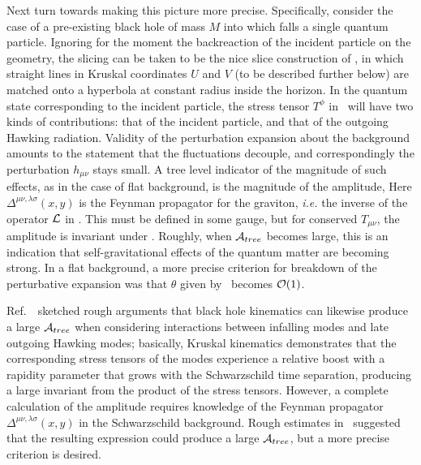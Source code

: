 
Next turn towards making this picture more precise.  Specifically, consider the case of a pre-existing black hole of mass $M$ into which falls a single quantum particle.  Ignoring for the moment the backreaction of the incident particle on the geometry, the slicing can be taken to be the nice slice construction of , in which straight lines in Kruskal coordinates $U$ and $V$ (to be described further below) are matched onto a hyperbola at constant radius inside the horizon.  In the quantum state corresponding to the incident particle, the stress tensor $T^\phi$ in \gravpert\ will have two kinds of contributions: that of the incident particle, and that of the outgoing Hawking radiation.  Validity of the perturbation expansion about the background amounts to the statement that the fluctuations decouple, and correspondingly the perturbation $h_{\mu\nu}$ stays small.  A tree level indicator of the magnitude of such effects, as in the case of flat background, is the magnitude of the amplitude,
%
\eqn{}
%
Here $\Delta^{\mu\nu,\lambda\sigma}(x,y)$ is the Feynman propagator for the graviton, {\it i.e.} the inverse of the operator ${\cal L}$ in \gravpert.  This must be defined in some gauge, but for conserved $T_{\mu\nu}$, the amplitude is invariant under \lindif.
Roughly, when ${\cal A}_{tree}$ becomes large, this is an indication that self-gravitational effects of the quantum matter are becoming strong. In a flat background, a more precise criterion for breakdown of the perturbative expansion was that $\theta$ given by \classang\  becomes ${\cal O}(1)$.  

Ref.~\SGnonloc\ sketched rough arguments that black hole kinematics can likewise produce a large ${\cal A}_{tree}$ when considering interactions between infalling modes and late outgoing Hawking modes; basically, Kruskal kinematics demonstrates that the corresponding stress tensors of the modes experience a relative boost with a rapidity parameter that grows with the Schwarzschild time separation, producing a large invariant from the product of the stress tensors.  However, a complete calculation of the amplitude requires knowledge of the Feynman propagator $\Delta^{\mu\nu,\lambda\sigma}(x,y)$ in the Schwarzschild background.  Rough estimates in \SGnonloc\ suggested that the resulting expression could produce a large ${\cal A}_{tree}$, but a more precise criterion is desired.

